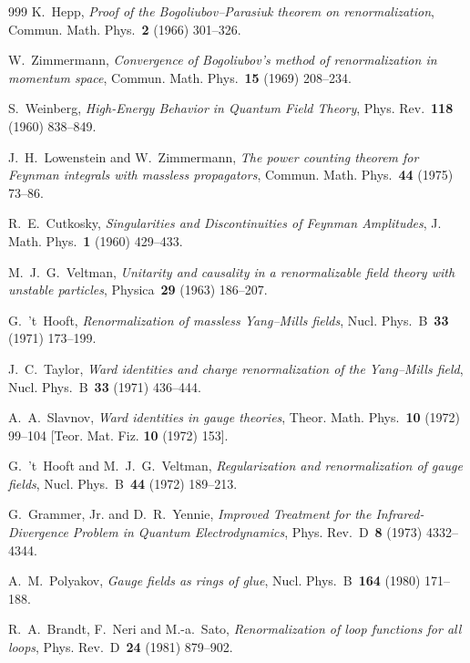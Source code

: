 \begin{thebibliography}{999}
K.~Hepp, \emph{Proof of the Bogoliubov--Parasiuk theorem on renormalization}, Commun. Math. Phys.~\textbf{2} (1966) \mbox{301--326}.

W.~Zimmermann, \emph{Convergence of Bogoliubov's method of renormalization in momentum space}, Commun. Math. Phys.~\textbf{15} (1969) \mbox{208--234}.

S.~Weinberg, \emph{High-Energy Behavior in Quantum Field Theory}, Phys. Rev.~\textbf{118} (1960) \mbox{838--849}.

J.~H.~Lowenstein and W.~Zimmermann, \emph{The power counting theorem for Feynman integrals with massless propagators}, Commun. Math. Phys.~\textbf{44} (1975) \mbox{73--86}.

R.~E.~Cutkosky, \emph{Singularities and Discontinuities of Feynman Amplitudes}, J. Math. Phys.~\textbf{1} (1960) \mbox{429--433}.

M.~J.~G.~Veltman, \emph{Unitarity and causality in a renormalizable field theory with unstable particles}, Physica~\textbf{29} (1963) \mbox{186--207}.

G.~'t~Hooft, \emph{Renormalization of massless Yang--Mills fields}, Nucl. Phys.~B~\textbf{33} (1971) \mbox{173--199}.

J.~C.~Taylor, \emph{Ward identities and charge renormalization of the Yang--Mills field}, Nucl. Phys.~B~\textbf{33} (1971) \mbox{436--444}.

A.~A.~Slavnov, \emph{Ward identities in gauge theories}, Theor. Math. Phys.~\textbf{10} (1972) \mbox{99--104} [Teor. Mat. Fiz. \textbf{10} (1972) \mbox{153}].

G.~'t~Hooft and M.~J.~G.~Veltman, \emph{Regularization and renormalization of gauge fields}, Nucl. Phys.~B~\textbf{44} (1972) \mbox{189--213}.

G.~Grammer, Jr. and D.~R.~Yennie, \emph{Improved Treatment for the Infrared-Divergence Problem in Quantum Electrodynamics}, Phys. Rev.~D~\textbf{8} (1973) \mbox{4332--4344}.

A.~M.~Polyakov, \emph{Gauge fields as rings of glue}, Nucl. Phys.~B~\textbf{164} (1980) \mbox{171--188}.

R.~A.~Brandt, F.~Neri and M.-a.~Sato, \emph{Renormalization of loop functions for all loops}, Phys. Rev.~D~\textbf{24} (1981) \mbox{879--902}.


\end{thebibliography}
